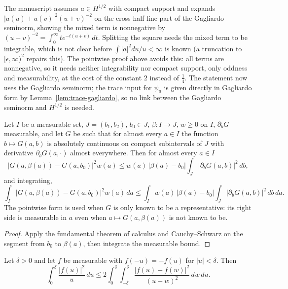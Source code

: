 \begin{remark}
The manuscript assumes $a\in H^{1/2}$ with compact support and expands
$|a(u)+a(v)|^2(u+v)^{-2}$ on the cross-half-line part of the Gagliardo seminorm,
showing the mixed term is nonnegative by $(u+v)^{-2}=\int_0^\infty te^{-t(u+v)}\,dt$.
Splitting the square needs the mixed term to be integrable, which is not clear
before $\int|a|^2du/u<\infty$ is known (a truncation to $[\epsilon,\infty)^2$ repairs
this). The pointwise proof above avoids this: all terms are nonnegative, so it needs
neither integrability nor compact support, only oddness and measurability, at the
cost of the constant $2$ instead of $\tfrac14$. The statement now uses the Gagliardo
seminorm; the trace input for $\psi_u$ is given directly in Gagliardo form by
Lemma~\ref{lem:trace-gagliardo}, so no link between the Gagliardo seminorm and $H^{1/2}$ is needed.
\end{remark}

\begin{lemma}
\label{lem:segment-estimate}
\leanok
Let $I$ be a measurable set, $J=(b_1,b_2)$, $b_0\in J$, $\beta\colon I\to J$, $w\ge0$ on $I$,
$\partial_bG$ measurable, and let $G$ be such that for almost every $a\in I$ the function
$b\mapsto G(a,b)$ is absolutely continuous on compact subintervals of $J$ with derivative
$\partial_bG(a,\cdot)$ almost everywhere. Then for almost every $a\in I$
\[
  |G(a,\beta(a))-G(a,b_0)|^2w(a)\le w(a)\,|\beta(a)-b_0|\int_J|\partial_bG(a,b)|^2\,db,
\]
and integrating,
\[
  \int_I|G(a,\beta(a))-G(a,b_0)|^2w(a)\,da\le\int_I w(a)\,|\beta(a)-b_0|
    \int_J|\partial_bG(a,b)|^2\,db\,da .
\]
The pointwise form is used when $G$ is only known to be a representative: its right side is
measurable in $a$ even when $a\mapsto G(a,\beta(a))$ is not known to be.
\end{lemma}

\begin{proof}
\leanok
Apply the fundamental theorem of calculus and Cauchy--Schwarz on the
segment from $b_0$ to $\beta(a)$, then integrate the measurable bound.
\end{proof}

\begin{lemma}
\label{lem:local-odd-hardy}
\leanok
Let $\delta>0$ and let $f$ be measurable with $f(-u)=-f(u)$ for $|u|<\delta$. Then
\[
  \int_0^\delta\frac{|f(u)|^2}{u}\,du\le2\int_0^\delta\int_{-\delta}^{\delta}
    \frac{|f(u)-f(w)|^2}{(u-w)^2}\,dw\,du .
\]
\end{lemma}

